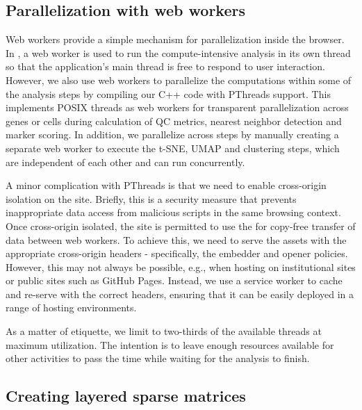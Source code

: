 \documentclass{article}
\begin{document}
\subsection{Parallelization with web workers}

Web workers provide a simple mechanism for parallelization inside the browser.
In , a web worker is used to run the compute-intensive analysis in its own thread so that the application's main thread is free to respond to user interaction.
However, we also use web workers to parallelize the computations within some of the analysis steps by compiling our C++ code with PThreads support.
This implements POSIX threads as web workers for transparent parallelization across genes or cells during calculation of QC metrics, nearest neighbor detection and marker scoring.
In addition, we parallelize across steps by manually creating a separate web worker to execute the t-SNE, UMAP and clustering steps, which are independent of each other and can run concurrently.

A minor complication with PThreads is that we need to enable cross-origin isolation on the  site.
Briefly, this is a security measure that prevents inappropriate data access from malicious scripts in the same browsing context.
Once cross-origin isolated, the site is permitted to use the  for copy-free transfer of data between web workers.
To achieve this, we need to serve the  assets with the appropriate cross-origin headers - specifically, the embedder and opener policies.
However, this may not always be possible, e.g., when hosting on institutional sites or public sites such as GitHub Pages.
Instead, we use a service worker to cache and re-serve  with the correct headers,
ensuring that it can be easily deployed in a range of hosting environments.

As a matter of etiquette, we limit  to two-thirds of the available threads at maximum utilization.
The intention is to leave enough resources available for other activities to pass the time while waiting for the analysis to finish.

\subsection{Creating layered sparse matrices}
\end{document}
